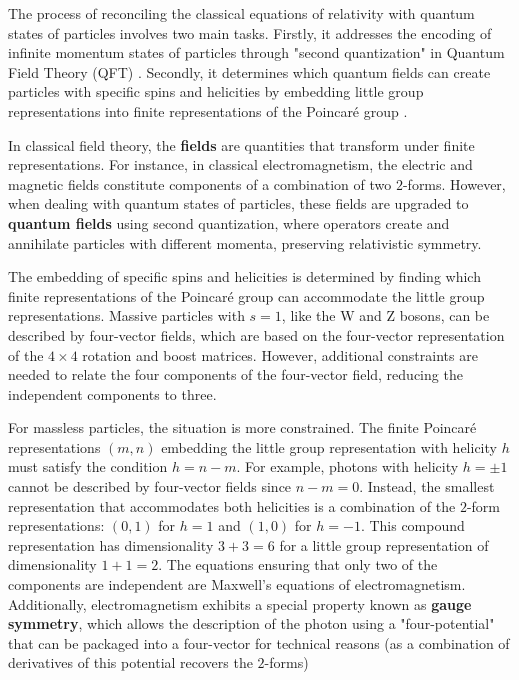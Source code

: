 \documentclass[12pt]{article}
\begin{document}
The process of reconciling the classical equations of relativity with quantum states of particles involves two main tasks. Firstly, it addresses the encoding of infinite momentum states of particles through "second quantization" in Quantum Field Theory (QFT) \cite{weinberg1995quantum}. Secondly, it determines which quantum fields can create particles with specific spins and helicities by embedding little group representations into finite representations of the Poincaré group \cite{ryder1996quantum}.

In classical field theory, the \textbf{fields} are quantities that transform under finite representations. For instance, in classical electromagnetism, the electric and magnetic fields constitute components of a combination of two $2$-forms. However, when dealing with quantum states of particles, these fields are upgraded to \textbf{quantum fields} using second quantization, where operators create and annihilate particles with different momenta, preserving relativistic symmetry.

The embedding of specific spins and helicities is determined by finding which finite representations of the Poincaré group can accommodate the little group representations. Massive particles with $s=1$, like the W and Z bosons, can be described by four-vector fields, which are based on the four-vector representation of the $4 \times 4$ rotation and boost matrices. However, additional constraints are needed to relate the four components of the four-vector field, reducing the independent components to three.

For massless particles, the situation is more constrained. The finite Poincaré representations $\left(m,n\right)$ embedding the little group representation with helicity $h$ must satisfy the condition $h = n - m$. For example, photons with helicity $h = \pm 1$ cannot be described by four-vector fields since $n - m = 0$. Instead, the smallest representation that accommodates both helicities is a combination of the $2$-form representations: $\left(0,1\right)$ for $h=1$ and $\left(1,0\right)$ for $h=-1$. This compound representation has dimensionality $3+3=6$ for a little group representation of dimensionality $1+1=2$. The equations ensuring that only two of the components are independent are Maxwell's equations of electromagnetism. Additionally, electromagnetism exhibits a special property known as \textbf{gauge symmetry}, which allows the description of the photon using a "four-potential" that can be packaged into a four-vector for technical reasons (as a combination of derivatives of this potential recovers the $2$-forms)
\end{document}
